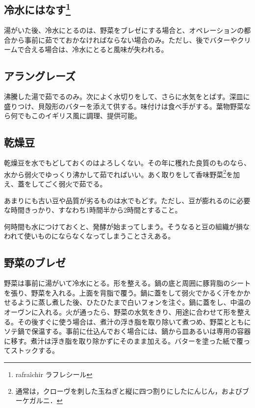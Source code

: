 \hypertarget{rafraichissage}{%
\subsection[冷水にはなす]{\texorpdfstring{冷水にはなす\footnote{rafraîchir
  ラフレシール}}{冷水にはなす}}\label{rafraichissage}}

湯がいた後、冷水にとるのは、野菜をブレゼにする場合と、オペレーションの都合から事前に茹でておかなければならない場合のみ。ただし、後でバターやクリームで合える場合は、冷水にとると風味が失われる。

\hypertarget{cuisson-des-legumes-a-l-anglaise}{%
\subsection{アラングレーズ}\label{cuisson-des-legumes-a-l-anglaise}}

沸騰した湯で茹でるのみ。次によく水切りをして、さらに水気をとばす。深皿に盛りつけ、貝殻形のバターを添えて供する。味付けは食べ手がする。葉物野菜なら何でもこのイギリス風に調理、提供可能。

\hypertarget{cuisson-des-legumes-secs}{%
\subsection{乾燥豆}\label{cuisson-des-legumes-secs}}

乾燥豆を水でもどしておくのはよろしくない。その年に穫れた良質のものなら、水から弱火でゆっくり沸かして茹でればいい。あく取りをして香味野菜\footnote{通常は，クローヴを刺した玉ねぎと縦に四つ割りにしたにんじん，およびブーケガルニ．}を加え、蓋をしてごく弱火で茹でる。

あまりにも古い豆や品質が劣るものは水でもどす。ただし、豆が膨れるのに必要な時間きっかり、すなわち1時間半から2時間とすること。

何時間も水につけておくと、発酵が始まってしまう。そうなると豆の組織が損なわれて使いものにならなくなってしまうことさえある。

\hypertarget{braisage-des-legumes}{%
\subsection{野菜のブレゼ}\label{braisage-des-legumes}}

野菜は事前に湯がいて冷水にとる。形を整える。鍋の底と周囲に豚背脂のシートを張り、野菜を入れる。上面を背脂で覆う。鍋に蓋をして弱火でかるく汗をかかせるように蒸し煮した後、ひたひたまで白いフォンを注ぐ。鍋に蓋をし、中温のオーヴンに入れる。火が通ったら、野菜の水気をきり、用途に合わせて形を整える。その後すぐに使う場合は、煮汁の浮き脂を取り除いて煮つめ、野菜とともにソテ鍋で保温する。事前に仕込んでおく場合には、鍋から皿あるいは専用の容器に移す。煮汁は浮き脂を取り除かずにそのまま加える。バターを塗った紙で覆ってストックする。

